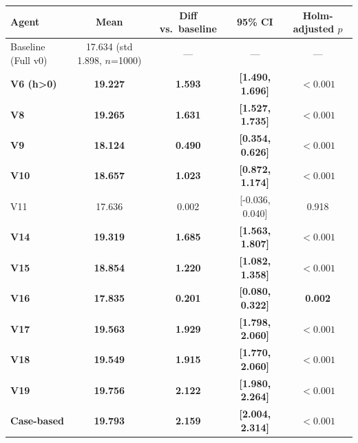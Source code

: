 \begin{tabular}{lcccc}
\toprule
Agent & Mean & Diff vs.\ baseline & 95\% CI & Holm-adjusted $p$ \\
\midrule
Baseline (Full v0) & 17.634 (std 1.898, $n$=1000) & --- & --- & --- \\
\textbf{V6 (h>0)} & \textbf{19.227} & \textbf{1.593} & \textbf{[1.490, 1.696]} & \textbf{$<0.001$} \\
\textbf{V8} & \textbf{19.265} & \textbf{1.631} & \textbf{[1.527, 1.735]} & \textbf{$<0.001$} \\
\textbf{V9} & \textbf{18.124} & \textbf{0.490} & \textbf{[0.354, 0.626]} & \textbf{$<0.001$} \\
\textbf{V10} & \textbf{18.657} & \textbf{1.023} & \textbf{[0.872, 1.174]} & \textbf{$<0.001$} \\
V11 & 17.636 & 0.002 & [-0.036, 0.040] & 0.918 \\
\textbf{V14} & \textbf{19.319} & \textbf{1.685} & \textbf{[1.563, 1.807]} & \textbf{$<0.001$} \\
\textbf{V15} & \textbf{18.854} & \textbf{1.220} & \textbf{[1.082, 1.358]} & \textbf{$<0.001$} \\
\textbf{V16} & \textbf{17.835} & \textbf{0.201} & \textbf{[0.080, 0.322]} & \textbf{0.002} \\
\textbf{V17} & \textbf{19.563} & \textbf{1.929} & \textbf{[1.798, 2.060]} & \textbf{$<0.001$} \\
\textbf{V18} & \textbf{19.549} & \textbf{1.915} & \textbf{[1.770, 2.060]} & \textbf{$<0.001$} \\
\textbf{V19} & \textbf{19.756} & \textbf{2.122} & \textbf{[1.980, 2.264]} & \textbf{$<0.001$} \\
\textbf{Case-based} & \textbf{19.793} & \textbf{2.159} & \textbf{[2.004, 2.314]} & \textbf{$<0.001$} \\
\bottomrule
\end{tabular}
